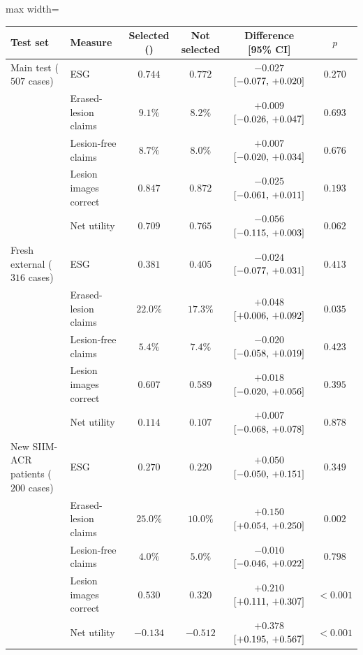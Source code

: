 \begin{table}[!htbp]
\vspace{0.6em}
\begin{adjustbox}{max width=\linewidth}
\begin{tabular}{ll cc cc}
\toprule
Test set & Measure & Selected (\msn{}) & Not selected & Difference [95\% CI] & $p$ \\
\midrule
Main test ($507$ cases) & ESG & $0.744$ & $0.772$ & $-0.027$ $[-0.077,\,+0.020]$ & $0.270$ \\
 & Erased-lesion claims & $9.1\%$ & $8.2\%$ & $+0.009$ $[-0.026,\,+0.047]$ & $0.693$ \\
 & Lesion-free claims & $8.7\%$ & $8.0\%$ & $+0.007$ $[-0.020,\,+0.034]$ & $0.676$ \\
 & Lesion images correct & $0.847$ & $0.872$ & $-0.025$ $[-0.061,\,+0.011]$ & $0.193$ \\
 & Net utility & $0.709$ & $0.765$ & $-0.056$ $[-0.115,\,+0.003]$ & $0.062$ \\
\midrule
Fresh external ($316$ cases) & ESG & $0.381$ & $0.405$ & $-0.024$ $[-0.077,\,+0.031]$ & $0.413$ \\
 & Erased-lesion claims & $22.0\%$ & $17.3\%$ & $+0.048$ $[+0.006,\,+0.092]$ & $0.035$ \\
 & Lesion-free claims & $5.4\%$ & $7.4\%$ & $-0.020$ $[-0.058,\,+0.019]$ & $0.423$ \\
 & Lesion images correct & $0.607$ & $0.589$ & $+0.018$ $[-0.020,\,+0.056]$ & $0.395$ \\
 & Net utility & $0.114$ & $0.107$ & $+0.007$ $[-0.068,\,+0.078]$ & $0.878$ \\
\midrule
New SIIM-ACR patients ($200$ cases) & ESG & $0.270$ & $0.220$ & $+0.050$ $[-0.050,\,+0.151]$ & $0.349$ \\
 & Erased-lesion claims & $25.0\%$ & $10.0\%$ & $+0.150$ $[+0.054,\,+0.250]$ & $0.002$ \\
 & Lesion-free claims & $4.0\%$ & $5.0\%$ & $-0.010$ $[-0.046,\,+0.022]$ & $0.798$ \\
 & Lesion images correct & $0.530$ & $0.320$ & $+0.210$ $[+0.111,\,+0.307]$ & $<0.001$ \\
 & Net utility & $-0.134$ & $-0.512$ & $+0.378$ $[+0.195,\,+0.567]$ & $<0.001$ \\
\bottomrule
\end{tabular}
\end{adjustbox}
\end{table}


